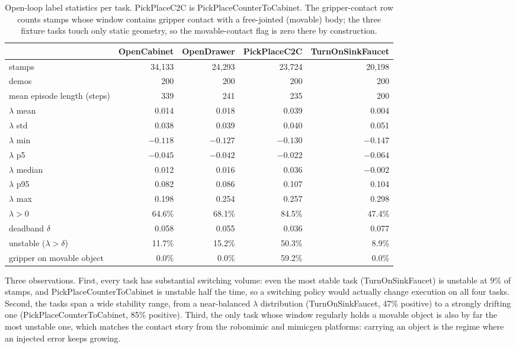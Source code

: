 \documentclass[11pt]{article}
\begin{document}
\begin{table}[h]
\centering
\small
\begin{tabular}{lrrrr}
\toprule
 & OpenCabinet & OpenDrawer & PickPlaceC2C & TurnOnSinkFaucet \\
\midrule
stamps & 34{,}133 & 24{,}293 & 23{,}724 & 20{,}198 \\
demos & 200 & 200 & 200 & 200 \\
mean episode length (steps) & 339 & 241 & 235 & 200 \\
\midrule
$\lambda$ mean & 0.014 & 0.018 & 0.039 & 0.004 \\
$\lambda$ std & 0.038 & 0.039 & 0.040 & 0.051 \\
$\lambda$ min & $-0.118$ & $-0.127$ & $-0.130$ & $-0.147$ \\
$\lambda$ p5 & $-0.045$ & $-0.042$ & $-0.022$ & $-0.064$ \\
$\lambda$ median & 0.012 & 0.016 & 0.036 & $-0.002$ \\
$\lambda$ p95 & 0.082 & 0.086 & 0.107 & 0.104 \\
$\lambda$ max & 0.198 & 0.254 & 0.257 & 0.298 \\
\midrule
$\lambda > 0$ & 64.6\% & 68.1\% & 84.5\% & 47.4\% \\
deadband $\delta$ & 0.058 & 0.055 & 0.036 & 0.077 \\
unstable ($\lambda > \delta$) & 11.7\% & 15.2\% & 50.3\% & 8.9\% \\
gripper on movable object & 0.0\% & 0.0\% & 59.2\% & 0.0\% \\
\bottomrule
\end{tabular}
\caption{Open-loop label statistics per task. PickPlaceC2C is
PickPlaceCounterToCabinet. The gripper-contact row counts stamps whose window
contains gripper contact with a free-jointed (movable) body; the three fixture
tasks touch only static geometry, so the movable-contact flag is zero there by
construction.}
\label{tab:stats}
\end{table}

Three observations. First, every task has substantial switching volume: even
the most stable task (TurnOnSinkFaucet) is unstable at 9\% of stamps, and
PickPlaceCounterToCabinet is unstable half the time, so a switching policy
would actually change execution on all four tasks. Second, the tasks span a
wide stability range, from a near-balanced $\lambda$ distribution
(TurnOnSinkFaucet, 47\% positive) to a strongly drifting one
(PickPlaceCounterToCabinet, 85\% positive). Third, the only task whose window
regularly holds a movable object is also by far the most unstable one, which
matches the contact story from the robomimic and mimicgen platforms: carrying
an object is the regime where an injected error keeps growing.
\end{document}
